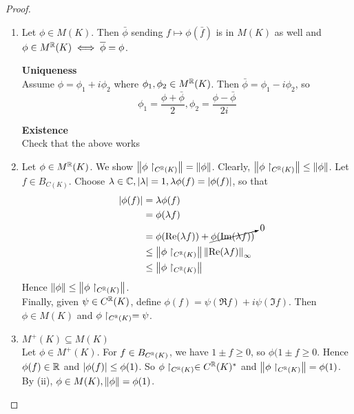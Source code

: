 \documentclass{article}
\begin{document}
\begin{proof}~
  \begin{enumerate}
    \item Let $\phi \in M(K)$. Then $\bar\phi$ sending $f \mapsto \phi(\bar f)$ is in $M(K)$ as well and $\phi \in M^\mathbb R(K) \iff \overline{\phi} = \phi$.

    {\bf Uniqueness} \\
    Assume $\phi = \phi_1 + i\phi_2$ where $\phi_1, \phi_2 \in M^\mathbb R(K)$. Then $\bar\phi = \phi_1 - i\phi_2$, so
    $$\phi_1 = \frac{\phi + \bar\phi}2, \phi_2 = \frac{\phi - \bar\phi}{2i}$$

    {\bf Existence} \\
    Check that the above works
    \item Let $\phi \in M^\mathbb R(K)$. We show $\left\lVert \phi\restriction_{C^\mathbb R(K)}\right\rVert = \left\lVert \phi\right\rVert$. Clearly, $\left\lVert \phi\restriction_{C^\mathbb R(K)}\right\rVert \le \left\lVert \phi\right\rVert$. Let $f \in B_{C(K)}$. Choose $\lambda \in \mathbb C, \left\lvert \lambda\right\rvert = 1, \lambda\phi(f) = \left\lvert \phi(f)\right\rvert$, so that
    \begin{align*}
      \left\lvert \phi(f)\right\rvert
      & = \lambda\phi(f) \\
      & = \phi(\lambda f) \\
      & = \phi(\operatorname{Re}(\lambda f)) + \cancelto 0{\phi(\operatorname{Im}(\lambda f))} \\
      & \le \left\lVert \phi\restriction_{C^\mathbb R(K)}\right\rVert \left\lVert \operatorname{Re}(\lambda f)\right\rVert_\infty \\
      & \le \left\lVert \phi\restriction_{C^\mathbb R(K)}\right\rVert
    \end{align*}
    Hence $\left\lVert \phi\right\rVert \le \left\lVert \phi\restriction_{C^\mathbb R(K)}\right\rVert$. \\
    Finally, given $\psi \in C^\mathbb R(K)$, define $\phi(f) = \psi(\Re f) + i\psi(\Im f)$. Then $\phi \in M(K)$ and $\phi\restriction_{C^\mathbb R(K)} = \psi$.
    \item {\bf $M^+(K) \subseteq M(K)$} \\
    Let $\phi \in M^+(K)$. For $f \in B_{C^\mathbb R(K)}$, we have $1 \pm f \ge 0$, so $\phi(1 \pm f \ge 0$. Hence $\phi(f) \in \mathbb R$ and $\left\lvert \phi(f)\right\rvert \le \phi(1)$. So $\phi\restriction_{C^\mathbb R(K)} \in C^\mathbb R(K)^*$ and $\left\lVert \phi\restriction_{C^\mathbb R(K)}\right\rVert = \phi(1)$. By (ii), $\phi \in M(K), \left\lVert \phi\right\rVert = \phi(1)$.


\end{enumerate}
\end{proof}
\end{document}
